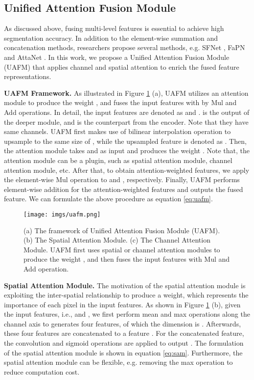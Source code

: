 \documentclass[10pt,twocolumn,letterpaper]{article}
\begin{document}
\subsection{Unified Attention Fusion Module}

As discussed above, fusing multi-level features is essential to achieve high segmentation accuracy.
In addition to the element-wise summation and concatenation methods, researchers propose several methods, e.g. SFNet \cite{li2020semantic}, FaPN \cite{huang2021fapn} and AttaNet \cite{song2021attanet}.
In this work, we propose a Unified Attention Fusion Module (UAFM) that applies channel and spatial attention to enrich the fused feature representations.

\noindent
\textbf{UAFM Framework.} As illustrated in Figure \ref{fig:uafm} (a), UAFM utilizes an attention module to produce the weight , and fuses the input features with  by Mul and Add operations. 
In detail, the input features are denoted as  and .
 is the output of the deeper module, and  is the counterpart from the encoder. Note that they have same channels.
UAFM first makes use of bilinear interpolation operation to upsample  to the same size of , while the upsampled feature is denoted as .
Then, the attention module takes  and  as input and produces the weight . Note that, the attention module can be a plugin, such as spatial attention module, channel attention module, etc.
After that, to obtain attention-weighted features, we apply the element-wise Mul operation to  and , respectively.
Finally, UAFM performs element-wise addition for the attention-weighted features and outputs the fused feature.
We can formulate the above procedure as equation \ref{eq:uafm}.



\begin{figure}[t]
  \centering
   \texttt{[image: imgs/uafm.png]}
   \caption{(a) The framework of Unified Attention Fusion Module (UAFM). (b) The Spatial Attention Module. (c) The Channel Attention Module. UAFM first uses spatial or channel attention modules to produce the weight , and then fuses the input features with Mul and Add operation.}
   \label{fig:uafm}
\end{figure}




\noindent
\textbf{Spatial Attention Module.}
The motivation of the spatial attention module is exploiting the inter-spatial relationship to produce a weight, which represents the importance of each pixel in the input features.
As shown in Figure \ref{fig:uafm} (b), given the input features, i.e.,  and , we first perform mean and max operations along the channel axis to generates four features, of which the dimension is . Afterwards, these four features are concatenated to a feature . For the concatenated feature, the convolution and sigmoid operations are applied to output . The formulation of the spatial attention module is shown in equation \ref{eq:sam}.
Furthermore, the spatial attention module can be flexible, e.g. removing the max operation to reduce computation cost.
\end{document}
